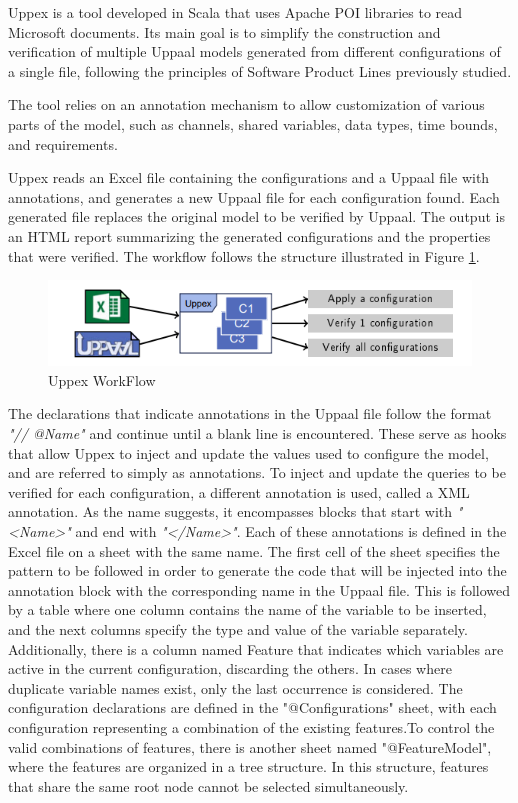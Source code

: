 Uppex is a tool developed in Scala that uses Apache POI libraries to read Microsoft documents. Its main goal is to simplify the construction and verification of multiple Uppaal models generated from different configurations of a single file, following the principles of Software Product Lines previously studied.

The tool relies on an annotation mechanism to allow customization of various parts of the model, such as channels, shared variables, data types, time bounds, and requirements.

Uppex reads an Excel file containing the configurations and a Uppaal file with annotations, and generates a new Uppaal file for each configuration found. Each generated file replaces the original model to be verified by Uppaal. The output is an HTML report summarizing the generated configurations and the properties that were verified. The workflow follows the structure illustrated in Figure \ref{fig:Uppex WorkFlow}.

\begin{figure} [H]
    \centering
    \includegraphics[width=\linewidth]{images/uppex_flow.png}
    \caption{Uppex WorkFlow \cite{proenca_uppex}}
    \label{fig:Uppex WorkFlow}
\end{figure}

The declarations that indicate annotations in the Uppaal file follow the format \textit{"// @Name"} and continue until a blank line is encountered. These serve as hooks that allow Uppex to inject and update the values used to configure the model, and are referred to simply as annotations. To inject and update the queries to be verified for each configuration, a different annotation is used, called a XML annotation. As the name suggests, it encompasses blocks that start with \textit{"<Name>"} and end with \textit{"</Name>"}. Each of these annotations is defined in the Excel file on a sheet with the same name. The first cell of the sheet specifies the pattern to be followed in order to generate the code that will be injected into the annotation block with the corresponding name in the Uppaal file. This is followed by a table where one column contains the name of the variable to be inserted, and the next columns specify the type and value of the variable separately. Additionally, there is a column named Feature that indicates which variables are active in the current configuration, discarding the others. In cases where duplicate variable names exist, only the last occurrence is considered. The configuration declarations are defined in the "@Configurations" sheet, with each configuration representing a combination of the existing features.To control the valid combinations of features, there is another sheet named "@FeatureModel", where the features are organized in a tree structure. In this structure, features that share the same root node cannot be selected simultaneously.

